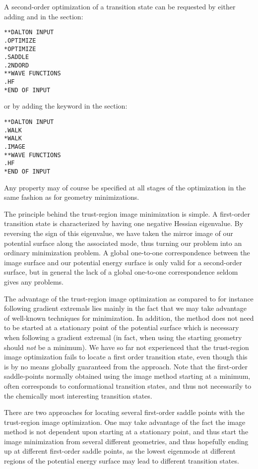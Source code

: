 A second-order optimization of a transition state can be requested by
either adding  and  in the 
section:
\begin{verbatim}
**DALTON INPUT
.OPTIMIZE
*OPTIMIZE
.SADDLE
.2NDORD
**WAVE FUNCTIONS
.HF
*END OF INPUT
\end{verbatim}
or by adding the keyword  in the  section:
\begin{verbatim}
**DALTON INPUT
.WALK
*WALK
.IMAGE
**WAVE FUNCTIONS
.HF
*END OF INPUT
\end{verbatim}

Any property may of course be specified at all stages of the
optimization in the same fashion as for geometry minimizations.

The principle behind the trust-region image minimization is simple. A
first-order transition state is characterized by having one negative
Hessian eigenvalue. By reversing the sign of this
eigenvalue, we have
taken the mirror image of our potential surface along the associated
mode, thus turning our problem into an ordinary
minimization problem. A global one-to-one correspondence between the
image surface and our potential energy surface is only valid for a
second-order surface, but in general the lack of a global one-to-one
correspondence seldom gives any problems.

The advantage of the trust-region image optimization as compared to
for instance following gradient extremals
lies mainly in the
fact that we may take advantage of well-known techniques for
minimization. In addition, the method does not need to be started at
a stationary point of the potential surface which is necessary when
following a gradient extremal (in fact, when using  the
starting geometry should {\em not} be a minimum). We
have so far not experienced that the trust-region image optimization
fails to locate a first order transition state, even though this is by
no means globally guaranteed from the approach. Note that the
first-order saddle-points normally obtained using the image method
starting at a minimum, often corresponds to conformational transition
states, and thus not necessarily to the chemically most interesting
transition states.

There are two approaches for locating several first-order saddle
points with the trust-region image optimization. One may take
advantage of the fact the image method is not dependent upon starting
at a stationary point, and thus start the image minimization from
several different geometries, and thus hopefully ending up at different
first-order saddle points, as the lowest eigenmode
at different
regions of the potential energy surface may lead to different
transition states.

